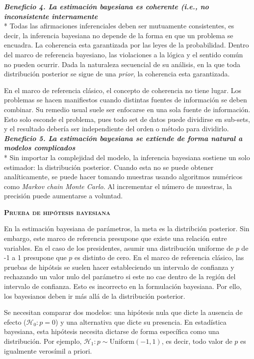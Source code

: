 \documentclass[a4paper,12pt]{article}
\begin{document}
{\slshape\bfseries Beneficio 4. La estimación bayesiana es coherente (i.e., no inconsistente internamente}\\*
Todas las afirmaciones inferenciales deben ser mutuamente consistentes, es decir, la inferencia bayesiana no depende de la forma en que un problema se encuadra. La coherencia esta garantizada por las leyes de la probabilidad. Dentro del marco de referencia bayesiano, las violaciones a la lógica y el sentido común no pueden ocurrir. Dada la naturaleza secuencial de su análisis, en la que toda distribución posterior se sigue de una {\slshape prior}, la coherencia esta garantizada. 

En el marco de referencia clásico, el concepto de coherencia no tiene lugar. Los problemas se hacen manifiestos cuando distintas fuentes de información se deben combinar. Su remedio usual suele ser enfocarse en una sola fuente de información. Esto solo esconde el problema, pues todo set de datos puede dividirse en sub-sets, y el resultado debería ser independiente del orden o método para dividirlo.\\

{\slshape\bfseries Beneficio 5. La estimación bayesiana se extiende de forma natural a modelos complicados}\\*
Sin importar la complejidad del modelo, la inferencia bayesiana sostiene un solo estimador: la distribución posterior. Cuando esta no se puede obtener analíticamente, se puede hacer tomando muestras usando algoritmos numéricos como {\slshape Markov chain Monte Carlo}. Al incrementar el número de muestras, la precisión puede aumentarse a voluntad.

{\scshape\bfseries Prueba de hipótesis bayesiana}

En la estimación bayesiana de parámetros, la meta es la distribción posterior. Sin embargo, este marco de referencia presupone que existe una relación entre variables. En el caso de los presidentes, asumir una distribución uniforme  de $p$ de -1 a 1 presupone que $p$ es distinto de cero. En el marco de referencia clásico, las pruebas de hipótsis se suelen hacer estableciendo un intervalo de confianza y rechazando un valor nulo del parámetro si este no cae dentro de la región del intervalo de confianza. Esto es incorrecto en la formulación bayesiana. Por ello, los bayesianos deben ir más allá de la distribución posterior. 

Se necesitan comparar dos modelos: una hipótesis nula que dicte la ausencia de efecto ($\mathcal H_0: p=0$) y una alternativa que dicte su presencia. En estadística bayesiana, esta hipótesis necesita dictarse de forma específica como una distribución. Por ejemplo, ${\mathcal H_1: p\sim \mbox{Uniform}(-1, 1)}$, es decir, todo valor de $p$ es igualmente verosímil a priori. 
\end{document}
